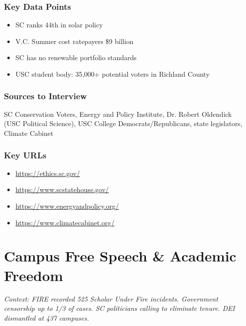 \documentclass[11pt,letterpaper]{article}
\begin{document}
\subsubsection*{Key Data Points}
\begin{itemize}[noitemsep]
    \item SC ranks 44th in solar policy
    \item V.C. Summer cost ratepayers \$9 billion
    \item SC has no renewable portfolio standards
    \item USC student body: 35,000+ potential voters in Richland County
\end{itemize}

\subsubsection*{Sources to Interview}
SC Conservation Voters, Energy and Policy Institute, Dr. Robert Oldendick (USC Political Science), USC College Democrats/Republicans, state legislators, Climate Cabinet

\subsubsection*{Key URLs}
\begin{itemize}[noitemsep]
    \item \url{https://ethics.sc.gov/}
    \item \url{https://www.scstatehouse.gov/}
    \item \url{https://www.energyandpolicy.org/}
    \item \url{https://www.climatecabinet.org/}
\end{itemize}

\newpage
\section{Campus Free Speech \& Academic Freedom}

\textit{Context: FIRE recorded 525 Scholar Under Fire incidents. Government censorship up to 1/3 of cases. SC politicians calling to eliminate tenure. DEI dismantled at 437 campuses.}

\newpage
\end{document}

